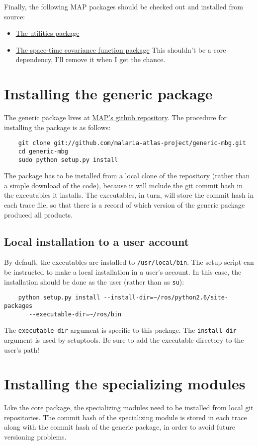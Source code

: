 Finally, the following MAP packages should be checked out and installed from source:
\begin{itemize}
    \item \href{http://github.com/malaria-atlas-project/map_utils}{The utilities package} 
    \item \href{http://github.com/malaria-atlas-project/st-cov-fun}{The space-time covariance function package} This shouldn't be a core dependency, I'll remove it when I get the chance.
\end{itemize}

\section{Installing the generic package}
The generic package lives at \href{http://github.com/malaria-atlas-project/generic-mbg}{MAP's github repository}. The procedure for installing the package is as follows:

\begin{verbatim}
    git clone git://github.com/malaria-atlas-project/generic-mbg.git
    cd generic-mbg
    sudo python setup.py install
\end{verbatim}

The package has to be installed from a local clone of the repository (rather than a simple download of the code), because it will include the git commit hash in the executables it installs. The executables, in turn, will store the commit hash in each trace file, so that there is a record of which version of the generic package produced all products.

\subsection{Local installation to a user account}
\label{sub:core-local} 
By default, the executables are installed to \texttt{/usr/local/bin}. The setup script can be instructed to make a local installation in a user's account. In this case, the installation should be done as the user (rather than as \texttt{su}):
\begin{verbatim}
    python setup.py install --install-dir=~/ros/python2.6/site-packages
       --executable-dir=~/ros/bin 
\end{verbatim}
The \texttt{executable-dir} argument is specific to this package. The \texttt{install-dir} argument is used by setuptools. Be sure to add the executable directory to the user's path!

\section{Installing the specializing modules}
\label{sec:spec-local} 
Like the core package, the specializing modules need to be installed from local git repositories. The commit hash of the specializing module is stored in each trace along with the commit hash of the generic package, in order to avoid future versioning problems.

